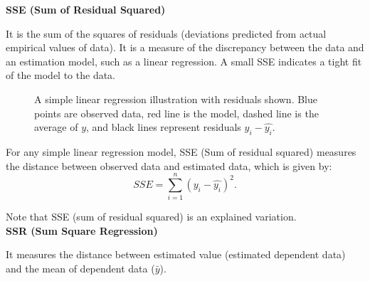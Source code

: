 \textbf{SSE (Sum of Residual Squared)}

It is the sum of the squares of residuals (deviations predicted from actual empirical values of data). It is a measure of the discrepancy between the data and an estimation model, such as a linear regression. A small SSE indicates a tight fit of the model to the data.

\begin{figure}[h]
\begin{center}
\end{center}
\caption{A simple linear regression illustration with residuals shown. Blue points are observed data, red line is the model, dashed line is the average of $y$, and black lines represent residuals $y_i - \hat{y_i}$.}
\end{figure}

\begin{definition}
For any simple linear regression model, SSE (Sum of residual squared) measures the distance between observed data and estimated data, which is given by: \[ SSE = \sum_{i=1}^{n} (y_i - \hat{y_i})^2.\]
\end{definition}

Note that SSE (sum of residual squared) is an explained variation.\\

\textbf{SSR (Sum Square Regression)}

It measures the distance between estimated value (estimated dependent data) and the mean of dependent data ($\bar{y}$).


